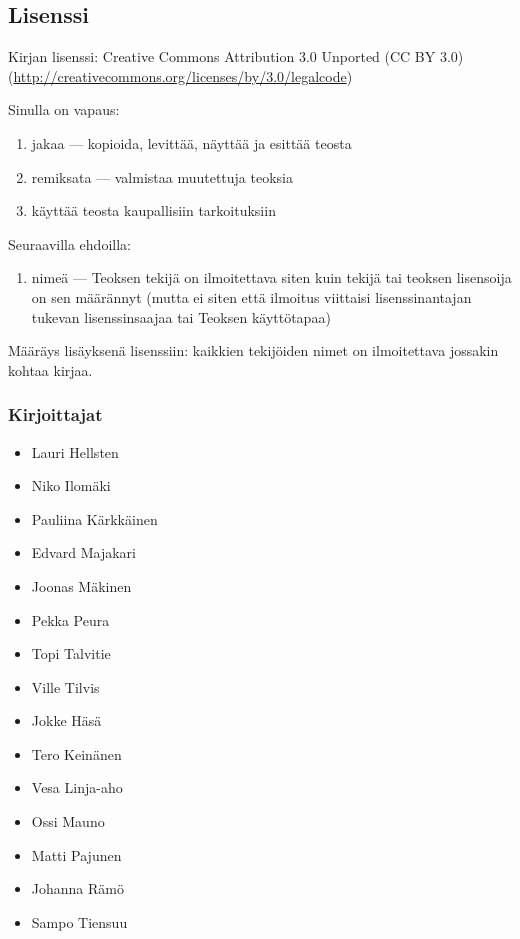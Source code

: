 \subsection*{Lisenssi}

Kirjan lisenssi: Creative Commons Attribution 3.0 Unported (CC BY 3.0) \\
(\url{http://creativecommons.org/licenses/by/3.0/legalcode})

Sinulla on vapaus:
\begin{enumerate}
\item jakaa — kopioida, levittää, näyttää ja esittää teosta
\item remiksata — valmistaa muutettuja teoksia
\item käyttää teosta kaupallisiin tarkoituksiin
\end{enumerate}
Seuraavilla ehdoilla:
\begin{enumerate}
\item nimeä — Teoksen tekijä on ilmoitettava siten kuin tekijä tai teoksen lisensoija on sen määrännyt (mutta ei siten että ilmoitus viittaisi lisenssinantajan tukevan lisenssinsaajaa tai Teoksen käyttötapaa)
\end{enumerate}

Määräys lisäyksenä lisenssiin: kaikkien tekijöiden nimet on ilmoitettava jossakin kohtaa kirjaa.

\subsubsection*{Kirjoittajat}
\begin{minipage}[t]{0.5\textwidth}
\begin{itemize}
\item Lauri Hellsten
\item Niko Ilomäki
\item Pauliina Kärkkäinen
\item Edvard Majakari
\item Joonas Mäkinen
\item Pekka Peura
\item Topi Talvitie
\item Ville Tilvis
\end{itemize}
\end{minipage}
\begin{minipage}[t]{0.5\textwidth}
\begin{itemize}
\item Jokke Häsä
\item Tero Keinänen
\item Vesa Linja-aho
\item Ossi Mauno
\item Matti Pajunen
\item Johanna Rämö
\item Sampo Tiensuu
\end{itemize}
\end{minipage} \\
\\
\\
\\

